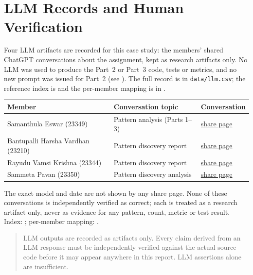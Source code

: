 \documentclass[11pt,a4paper]{article}
\begin{document}
\section{LLM Records and Human Verification}
Four LLM artifacts are recorded for this case study: the members' shared ChatGPT
conversations about the assignment, kept as research artifacts only. No LLM was
used to produce the Part~2 or Part~3 code, tests or metrics, and no new prompt was
issued for Part~2 (see ). The full record is
in \texttt{data/llm.csv}; the reference index is
 and the per-member mapping is in
.

\begin{center}
\small
\begin{tabular}{@{}p{} p{} p{}@{}}
\toprule
Member & Conversation topic & Conversation \\
\midrule
Samanthula Eswar (23349) & Pattern analysis (Parts 1--3) & \href{https://chatgpt.com/share/6aca22a9-2844-83ec-8126-e6f81ef8e85e}{share page} \\
Bantupalli Harsha Vardhan (23210) & Pattern discovery report & \href{https://chatgpt.com/share/6acf4ad3-5900-83ee-bd23-a3440efaf33a}{share page} \\
Rayudu Vamsi Krishna (23344) & Pattern discovery report & \href{https://chatgpt.com/share/6acf4a3b-0d60-83ee-af0e-eb5a739699e1?ogimg=plain}{share page} \\
Sammeta Pavan (23350) & Pattern discovery analysis & \href{https://chatgpt.com/share/6acf5448-c740-83e8-b064-e5604a16fb75?ogimg=plain}{share page} \\
\bottomrule
\end{tabular}
\end{center}

The exact model and date are not shown by any share page. None of these
conversations is independently verified as correct; each is treated as a research
artifact only, never as evidence for any pattern, count, metric or test result.
Index: ; per-member mapping:
.

\begin{quote}
LLM outputs are recorded as artifacts only. Every claim derived from an LLM
response must be independently verified against the actual source code before
it may appear anywhere in this report. LLM assertions alone are insufficient.
\end{quote}
\end{document}
